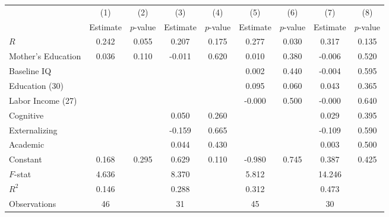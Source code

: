 \begin{tabular}{lcccccccc} \toprule
 & (1) & (2) & (3) & (4) & (5) & (6) & (7) & (8) \\ 
 & Estimate  & $p$-value  & Estimate  & $p$-value  & Estimate  & $p$-value  & Estimate  & $p$-value  \\  \midrule
$R$ &     0.242 &     0.055 &     0.207 &     0.175 &     0.277 &     0.030 &     0.317 &     0.135 \\  
Mother's Education &     0.036 &     0.110 &    -0.011 &     0.620 &     0.010 &     0.380 &    -0.006 &     0.520 \\  
Baseline IQ &         &         &         &         &     0.002 &     0.440 &    -0.004 &     0.595 \\  
Education (30) &         &         &         &         &     0.095 &     0.060 &     0.043 &     0.365 \\  
Labor Income (27) &         &         &         &         &    -0.000 &     0.500 &    -0.000 &     0.640 \\  
Cognitive &         &         &     0.050 &     0.260 &         &         &     0.029 &     0.395 \\  
Externalizing &         &         &    -0.159 &     0.665 &         &         &    -0.109 &     0.590 \\  
Academic &         &         &     0.044 &     0.430 &         &         &     0.003 &     0.500 \\  
Constant &     0.168 &     0.295 &     0.629 &     0.110 &    -0.980 &     0.745 &     0.387 &     0.425 \\  \midrule
$F$-stat &     4.636 &         &     8.370 &         &     5.812 &         &    14.246 &         \\  
$R^2$ &     0.146 &         &     0.288 &         &     0.312 &         &     0.473 &         \\  
Observations &    46 &         &    31 &         &    45 &         &    30 &         \\  
\bottomrule 
\end{tabular}


